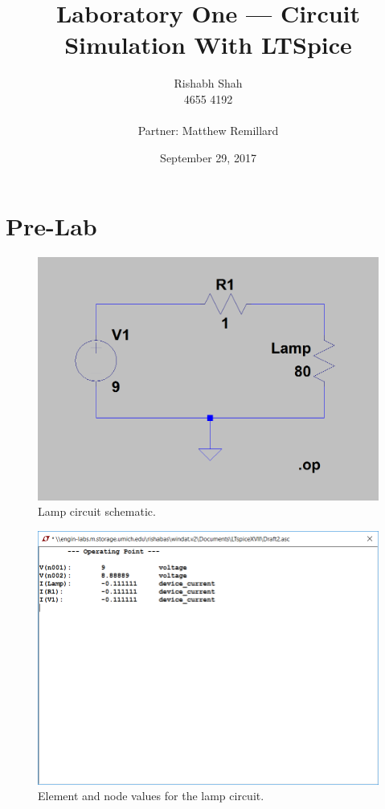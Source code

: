 \documentclass[10pt]{article}
\begin{document}
\title{Laboratory One --- Circuit Simulation With LTSpice}
\date{September 29, 2017}
\author{Rishabh Shah\\ 4655 4192\\ \\ Partner: Matthew Remillard}
\maketitle
\newpage

\section*{Pre-Lab}
\begin{figure}[H]
	\centering
		\includegraphics[width=5in]{Capture1}
	\caption{Lamp circuit schematic.}
\end{figure}
\begin{figure}[H]
	\centering
		\includegraphics[width=5in]{Capture}
	\caption{Element and node values for the lamp circuit.}
\end{figure}
\end{document}
